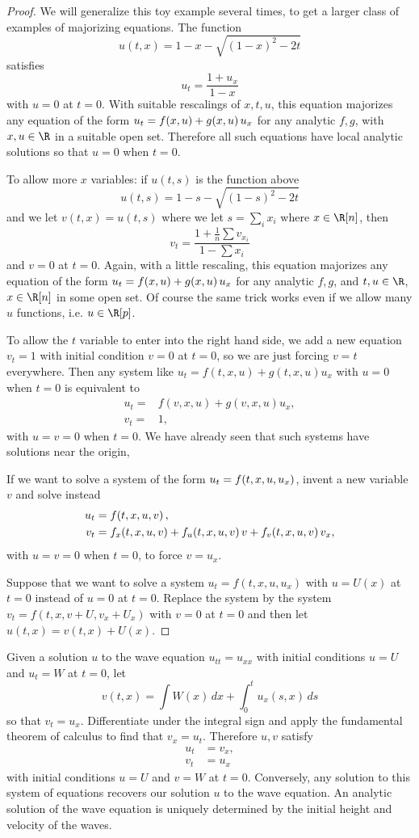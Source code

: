 \begin{proof}
We will generalize this toy example several times, to get a larger class of examples of majorizing equations.
The function
\[
 u(t,x)=1-x-\sqrt{(1-x)^2-2t}
\]
satisfies
\[
 u_t=\frac{1+u_x}{1-x}
\]
with \(u=0\) at \(t=0\).
With suitable rescalings of \(x,t,u\), this equation majorizes any equation of the form \(u_t=f\!\left(x,u\right)+g\!\left(x,u\right)u_x\) for any analytic \(f, g\), with \(x,u \in \R\) in a suitable open set.
Therefore all such equations have local analytic solutions so that \(u=0\) when \(t=0\).

To allow more \(x\) variables: if \(u(t,s)\) is the function above
\[
 u(t,s)=1-s-\sqrt{(1-s)^2-2t} 
\]
and we let \(v(t,x)=u(t,s)\) where we let \(s=\sum_i x_i\) where \(x \in \R[n]\), then 
\[
 v_t = \frac{1+\frac{1}{n}\sum v_{x_i}}{1-\sum x_i}
\]
and \(v=0\) at \(t=0\).
Again, with a little rescaling, this equation majorizes any equation of the form \(u_t=f\!\left(x,u\right)+g\!\left(x,u\right)u_x\) for any analytic \(f, g\), and \(t,u \in \R\), \(x \in \R[n]\) in some open set.
Of course the same trick works even if we allow many \(u\) functions, i.e. \(u \in \R[p]\).

To allow the \(t\) variable to enter into the right hand side, we add a new equation \(v_t=1\) with initial condition \(v=0\) at \(t=0\), so we are just forcing \(v=t\) everywhere.
Then any system like \(u_t=f(t,x,u)+g(t,x,u)u_x\) with \(u=0\) when \(t=0\) is equivalent to 
\begin{align*}
 u_t=&f(v,x,u)+g(v,x,u)u_x, \\
 v_t=&1,
\end{align*}
with \(u=v=0\) when \(t=0\).
We have already seen that such systems have solutions near the origin, 

If we want to solve a system of the form \(u_t=f\!\left(t,x,u,u_x\right)\), invent a new variable \(v\) and solve instead
\begin{align*}
u_t &= f\!\left(t,x,u,v\right), \\
v_t &= f_x\!\left(t,x,u,v\right) + f_u\!\left(t,x,u,v\right)v+f_v\!\left(t,x,u,v\right)v_x,
\end{align*}
with \(u=v=0\) when \(t=0\), to force \(v=u_x\).

Suppose that we want to solve a system \(u_t=f(t,x,u,u_x)\) with \(u=U(x)\) at \(t=0\) instead of \(u=0\) at \(t=0\).
Replace the system by the system \(v_t=f(t,x,v+U,v_x+U_x)\) with \(v=0\) at \(t=0\) and then let \(u(t,x)=v(t,x)+U(x)\).
\end{proof}
\begin{example}
Given a solution \(u\) to the wave equation \(u_{tt} = u_{xx}\) with initial conditions \(u=U\) and \(u_t=W\) at \(t=0\), let
\[
   v(t,x)=\int W(x) \, dx + \int_0^t u_x(s,x) \, ds
\]
so that \(v_t=u_x\).
Differentiate under the integral sign and apply the fundamental theorem of calculus to find that \(v_x=u_t\).
Therefore \(u,v\) satisfy
\begin{align*}
  u_t &= v_x, \\
  v_t &= u_x
\end{align*}
with initial conditions \(u=U\) and \(v=W\) at \(t=0\).
Conversely, any solution to this system of equations recovers our solution \(u\) to the wave equation.
An analytic solution of the wave equation is uniquely determined by the initial height and velocity of the waves.
\end{example}
